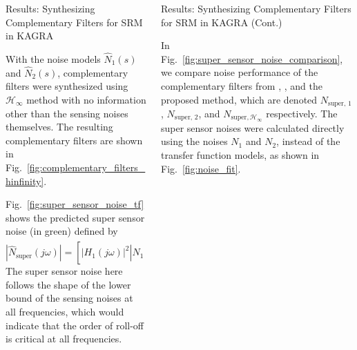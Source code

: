 \documentclass{beamer}
\begin{document}
\begin{frame}[t]
\begin{columns}[t]
\begin{column}{0.32\linewidth}
\begin{block}{Results: Synthesizing Complementary Filters for SRM in KAGRA}
				\medskip
				
				With the noise models $\hat{N}_1(s)$ and $\hat{N}_2(s)$, complementary filters were synthesized using $\mathcal{H}_\infty$ method with no information other than the sensing noises themselves.
				The resulting complementary filters are shown in Fig.~\ref{fig:complementary_filters_hinfinity}.
				
				\medskip
				
				Fig.~\ref{fig:super_sensor_noise_tf} shows the predicted super sensor noise (in green) defined by
				\begin{equation}
					\left\vert \hat{N}_\text{super}(j\omega)\right\vert = \left[\left\vert H_1(j\omega)\right\vert^2\left\vert \hat{N}_1(j\omega)\right\vert^2 + \left\vert H_2(j\omega)\right\vert^2\left\vert \hat{N}_2(j\omega)\right\vert^2\right]^{\frac{1}{2}}\,.
				\end{equation}
				The super sensor noise here follows the shape of the lower bound of the sensing noises at all frequencies, which would indicate that the order of roll-off is critical at all frequencies.
			\end{block}
		\end{column}
	
		\begin{column}{0.32\linewidth}
			\begin{block}{Results: Synthesizing Complementary Filters for SRM in KAGRA (Cont.)}
				
			In Fig.~\ref{fig:super_sensor_noise_comparison}, we compare noise performance of the complementary filters from \cite{Sekiguchi:2016bmv}, \cite{vanHeijningen:2018cpc}, and the proposed method, which are denoted $N_\text{super, 1}$, $N_\text{super, 2}$, and $N_{\text{super},\mathcal{H}_\infty}$ respectively.
			The super sensor noises were calculated directly using the noises $N_1$ and $N_2$, instead of the transfer function models, as shown in Fig.~\ref{fig:noise_fit}.
			

\end{block}
\end{column}
\end{columns}
\end{frame}
\end{document}
